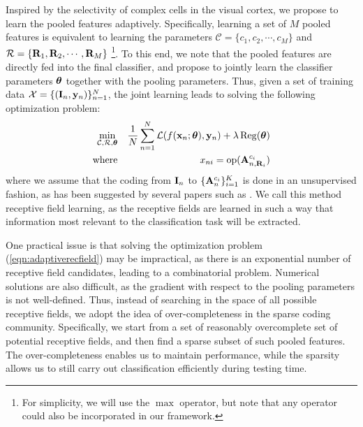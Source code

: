 Inspired by the selectivity of complex cells in the visual cortex, we propose to learn the pooled features adaptively. Specifically, learning a set of $M$ pooled features is equivalent to learning the parameters $\mathcal{C} = \{c_1,c_2,\cdots,c_M\}$ and $\mathcal{R} = \{\mathbf{R}_1,\mathbf{R}_2,\cdots,\mathbf{R}_M\}$ \footnote{For simplicity, we will use the $\max$ operator, but note that any operator could also be incorporated in our framework.}. To this end, we note that the pooled features are directly fed into the final classifier, and propose to jointly learn the classifier parameters $\boldsymbol{\theta}$ together with the pooling parameters. Thus, given a set of training data $\mathcal{X} = \{(\mathbf{I}_n,\mathbf{y}_n)\}_{n=1}^{N}$, the joint learning leads to solving the following optimization problem:
\begin{eqnarray}\label{eqn:adaptiverecfield}
  \min_{\mathcal{C},\mathcal{R},\boldsymbol{\theta}} & & \frac{1}{N}\sum_{n=1}^{N}\mathcal{L}(f(\mathbf{x}_n;\boldsymbol{\theta}),\mathbf{y}_n) + \lambda\operatorname{Reg}(\boldsymbol{\theta})\\
  \text{where} & & x_{ni} = \operatorname{op} (\mathbf{A}^{c_i}_{n,\mathbf{R}_{i}})\nonumber
\end{eqnarray}
where we assume that the coding from $\mathbf{I}_{n}$ to $\{\mathbf{A}^{c_i}_{n}\}_{i=1}^{K}$ is done in an unsupervised fashion, as has been suggested by several papers such as \cite{coates2010aistats}. We call this method receptive field learning, as the receptive fields are learned in such a way that information most relevant to the classification task will be extracted.

One practical issue is that solving the optimization problem (\ref{eqn:adaptiverecfield}) may be impractical, as there is an exponential number of receptive field candidates, leading to a combinatorial problem. Numerical solutions are also difficult, as the gradient with respect to the pooling parameters is not well-defined. Thus, instead of searching in the space of all possible receptive fields, we adopt the idea of over-completeness in the sparse coding community. Specifically, we start from a set of reasonably overcomplete set of potential receptive fields, and then find a sparse subset of such pooled features. The over-completeness enables us to maintain performance, while the sparsity allows us to still carry out classification efficiently during testing time.

